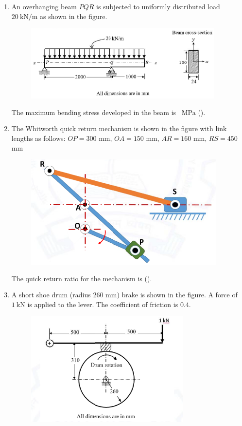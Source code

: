 \documentclass[journal]{IEEEtran}
\begin{document}
\begin{enumerate}
\hfill{}

\item An overhanging beam $PQR$ is subjected to uniformly distributed load $20~\text{kN/m}$ as shown in the figure.
\begin{figure}[h]
\centering
\includegraphics[width=0.5\columnwidth]{Figs/image (55).png}
\caption*{}
\label{fig:51}
\end{figure}

The maximum bending stress developed in the beam is \underline{\hspace{2cm}}~MPa ().

\hfill{}

\item The Whitworth quick return mechanism is shown in the figure with link lengths as follows: $OP=300$ mm, $OA=150$ mm, $AR=160$ mm, $RS=450$ mm
\begin{figure}[h]
\centering
\includegraphics[width=0.5\columnwidth]{Figs/image (56).png}
\caption*{}
\label{fig:52}
\end{figure}

The quick return ratio for the mechanism is \underline{\hspace{2cm}} ().

\hfill{}

\item A short shoe drum (radius $260$ mm) brake is shown in the figure. A force of $1~\text{kN}$ is applied to the lever. The coefficient of friction is $0.4$.
\begin{figure}[h]
\centering
\includegraphics[width=0.5\columnwidth]{Figs/image (57).png}
\caption*{}
\label{fig:53}
\end{figure}


\end{enumerate}
\end{document}
